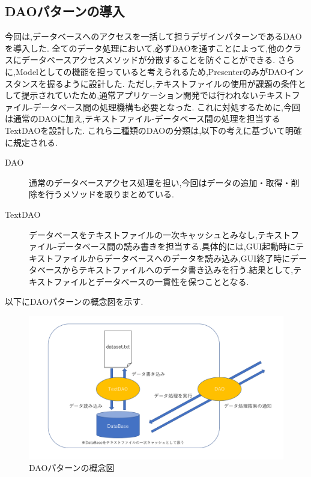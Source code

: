 \documentclass[12pt]{jarticle}
\begin{document}
\subsection{DAOパターンの導入}
今回は,データベースへのアクセスを一括して担うデザインパターンであるDAOを導入した.
全てのデータ処理において,必ずDAOを通すことによって,他のクラスにデータベースアクセスメソッドが分散することを防ぐことができる.
さらに,Modelとしての機能を担っていると考えられるため,PresenterのみがDAOインスタンスを握るように設計した.
ただし,テキストファイルの使用が課題の条件として提示されていたため,通常アプリケーション開発では行われないテキストファイル-データベース間の処理機構も必要となった.
これに対処するために,今回は通常のDAOに加え,テキストファイル-データベース間の処理を担当するTextDAOを設計した.
これら二種類のDAOの分類は,以下の考えに基づいて明確に規定される.
\begin{description}
\item[DAO] 通常のデータベースアクセス処理を担い,今回はデータの追加・取得・削除を行うメソッドを取りまとめている.
\item[TextDAO] データベースをテキストファイルの一次キャッシュとみなし,テキストファイル-データベース間の読み書きを担当する.具体的には,GUI起動時にテキストファイルからデータベースへのデータを読み込み,GUI終了時にデータベースからテキストファイルへのデータ書き込みを行う.結果として,テキストファイルとデータベースの一貫性を保つこととなる.
\end{description}
以下にDAOパターンの概念図を示す. \\
\begin{figure}[!hbt]
    \centering
    \includegraphics[scale=0.35]{images/dao_pattern.pdf}
    \caption{DAOパターンの概念図}
\end{figure}
\end{document}
